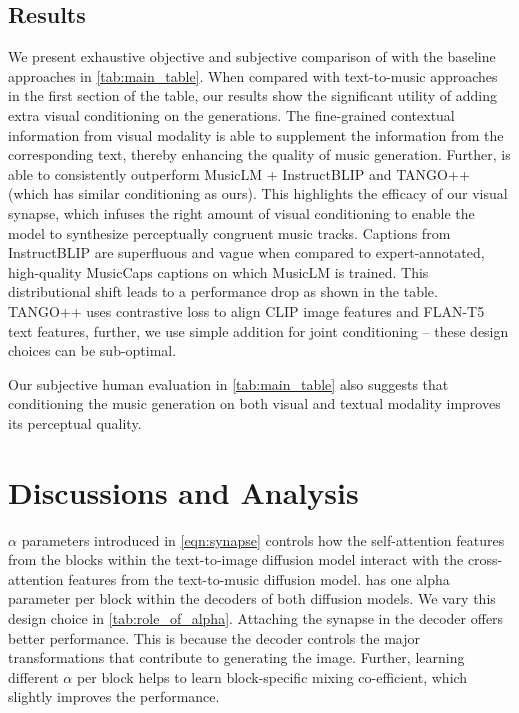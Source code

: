 \subsection{Results} \label{sec:main_results}
We present exhaustive objective and subjective comparison of \modelname with the baseline approaches in \cref{tab:main_table}.
When compared with text-to-music approaches in the first section of the table, our results show the significant utility of adding extra visual conditioning on the generations. The fine-grained contextual information from visual modality is able to supplement the information from the corresponding text, thereby enhancing the quality of music generation.
Further, \modelname is able to consistently outperform MusicLM + InstructBLIP and TANGO++ (which has similar conditioning as ours). This highlights the efficacy of our visual synapse, which infuses the right amount of visual conditioning to enable the model to synthesize perceptually congruent music tracks. Captions from InstructBLIP are superfluous and vague when compared to expert-annotated, high-quality MusicCaps captions on which MusicLM is trained. This distributional shift leads to a performance drop as shown in the table. TANGO++ uses contrastive loss to align CLIP image features and FLAN-T5 text features, further, we use simple addition for joint conditioning -- these design choices can be sub-optimal. 

Our subjective human evaluation in \cref{tab:main_table} also suggests that conditioning the music generation on both visual and textual modality improves its perceptual quality.

\section{Discussions and Analysis}

$\alpha$ parameters introduced in \cref{eqn:synapse} controls how the self-attention features from the blocks within the text-to-image diffusion model interact with the cross-attention features from the text-to-music diffusion model. \modelname has one alpha parameter per block within the decoders of both diffusion models. We vary this design choice in \cref{tab:role_of_alpha}. Attaching the synapse in the decoder offers better performance. This is because the decoder controls the major transformations that contribute to generating the image. Further, learning different $\alpha$ per block helps to learn block-specific mixing co-efficient, which slightly improves the performance. 


